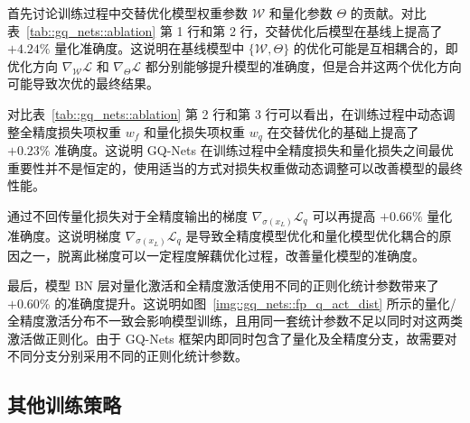 \documentclass[
  fontset = mac,
]{shtthesis}
\begin{document}
首先讨论训练过程中交替优化模型权重参数 $\mathcal{W}$ 和量化参数 $\Theta$ 的贡献。对比表~\ref{tab::gq_nets::ablation} 第 1 行和第 2 行，交替优化后模型在基线上提高了 $+4.24\%$ 量化准确度。这说明在基线模型中 $\{\mathcal{W}, \Theta\}$ 的优化可能是互相耦合的，即优化方向 $\nabla_{\mathcal{W}} \mathcal{L}$ 和 $\nabla_{\Theta} \mathcal{L}$ 都分别能够提升模型的准确度，但是合并这两个优化方向可能导致次优的最终结果。

对比表~\ref{tab::gq_nets::ablation} 第 2 行和第 3 行可以看出，在训练过程中动态调整全精度损失项权重 $w_f$ 和量化损失项权重 $w_q$ 在交替优化的基础上提高了 $+0.23\%$ 准确度。这说明 GQ-Nets 在训练过程中全精度损失和量化损失之间最优重要性并不是恒定的，使用适当的方式对损失权重做动态调整可以改善模型的最终性能。

通过不回传量化损失对于全精度输出的梯度 $\nabla_{\sigma(x_L)} \mathcal{L}_q$ 可以再提高 $+0.66\%$ 量化准确度。这说明梯度 $\nabla_{\sigma(x_L)} \mathcal{L}_q$ 是导致全精度模型优化和量化模型优化耦合的原因之一，脱离此梯度可以一定程度解藕优化过程，改善量化模型的准确度。

最后，模型 BN 层对量化激活和全精度激活使用不同的正则化统计参数带来了 $+0.60\%$ 的准确度提升。这说明如图~\ref{img::gq_nets::fp_q_act_dist} 所示的量化/全精度激活分布不一致会影响模型训练，且用同一套统计参数不足以同时对这两类激活做正则化。由于 GQ-Nets 框架内即同时包含了量化及全精度分支，故需要对不同分支分别采用不同的正则化统计参数。
\subsection{其他训练策略} \label{sec::gq_nets::other_training_protocol}
\end{document}
